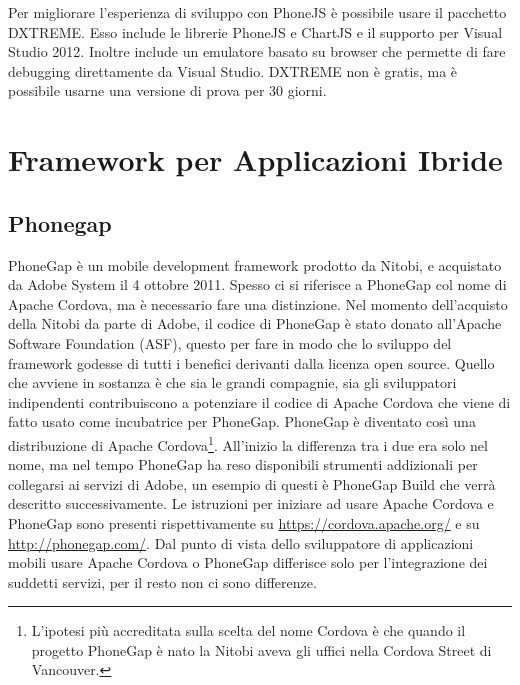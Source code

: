            Per migliorare l'esperienza di sviluppo con PhoneJS è possibile usare
            il pacchetto DXTREME. Esso include le librerie PhoneJS e ChartJS e il
            supporto per Visual Studio 2012. Inoltre include un emulatore basato
            su browser che permette di fare debugging direttamente da Visual Studio.
            DXTREME non è gratis, ma è possibile usarne una versione di prova per
            30 giorni.

    \section{Framework per Applicazioni Ibride}
    \label{sec:frameworkhybrid}
        \subsection{Phonegap}
        \label{subsec:hybridpg}
            PhoneGap è un mobile development frame\-work prodotto da Nitobi, e
            acquistato da Adobe System il 4 ottobre 2011.
            Spesso ci si riferisce a PhoneGap col nome di Apache Cordova, ma è
            necessario fare una distinzione.
            Nel momento dell'acquisto della Nitobi da parte di Adobe, il codice
            di PhoneGap è stato donato all'Apache Software Foundation (ASF),
            questo per fare in modo che lo sviluppo del frame\-work godesse di
            tutti i benefici derivanti dalla licenza open \mbox{source}.
            Quello che avviene in sostanza è che sia le grandi compagnie, sia
            gli sviluppatori indipendenti contribuiscono a potenziare il codice
            di Apache Cordova che viene di fatto usato come incubatrice per PhoneGap.
            PhoneGap è diventato così una distribuzione di Apache Cordova\footnote{
            L'ipotesi più accreditata sulla scelta del nome Cordova
            è che quando il progetto PhoneGap è nato la Nitobi aveva gli uffici
            nella Cordova Street di Vancouver.}. All'inizio la differenza tra
            i due era solo nel nome, ma nel tempo PhoneGap ha reso disponibili
            strumenti addizionali per collegarsi ai servizi di Adobe, un esempio
            di questi è PhoneGap Build che verrà
            descritto successivamente. Le istruzioni per iniziare ad usare
            Apache Cordova e PhoneGap sono presenti rispettivamente su
            \url{https://cordova.apache.org/} e su
            \url{http://phonegap.com/}. Dal punto di vista dello sviluppatore di
            applicazioni mobili usare Apache Cordova o PhoneGap differisce solo
            per l'integrazione dei suddetti servizi, per il resto non ci sono
            differenze.

